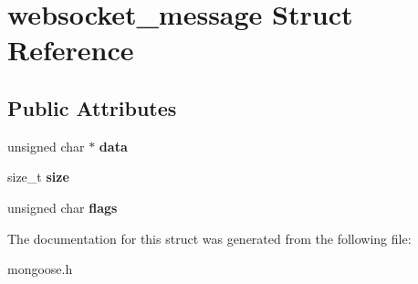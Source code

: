 \hypertarget{structwebsocket__message}{}\section{websocket\+\_\+message Struct Reference}
\label{structwebsocket__message}
\subsection*{Public Attributes}
\begin{DoxyCompactItemize}
\item 
\mbox{\label{structwebsocket__message_aeb8922c34831455b764d83083ae39968}} 
unsigned char $\ast$ {\bfseries data}
\item 
\mbox{\label{structwebsocket__message_af7ae89c0cba9566b64a47d40c5ea700a}} 
size\+\_\+t {\bfseries size}
\item 
\mbox{\label{structwebsocket__message_a72b32c83b4a065faac7ae28802a5adf1}} 
unsigned char {\bfseries flags}
\end{DoxyCompactItemize}


The documentation for this struct was generated from the following file\+:\begin{DoxyCompactItemize}
\item 
mongoose.\+h\end{DoxyCompactItemize}
